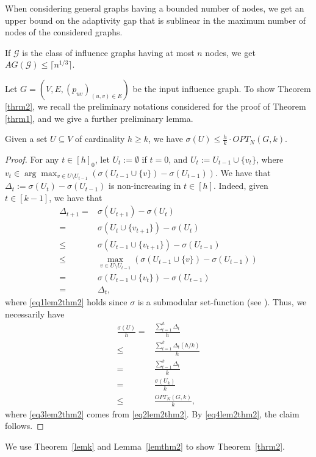 When considering general graphs having a bounded number of nodes, we get an upper bound on the adaptivity gap that is sublinear in the maximum number of nodes of the considered graphs. 

\begin{theorem}\label{thrm2}
If $\mathcal{G}$ is the class of influence graphs having at most $n$ nodes, we get $AG(\mathcal{G})\leq \lceil n^{1/3}\rceil .$ 
\end{theorem}

Let $G=(V,E,(p_{uv})_{(u,v)\in E})$ be the input influence graph. To show Theorem \ref{thrm2}, we recall the preliminary notations considered for the proof of Theorem \ref{thrm1}, and we give a further preliminary lemma. 
\begin{lemma}\label{lemthm2}
Given a set $U\subseteq V$ of cardinality $h\geq k$, we have $\sigma(U)\leq \frac{h}{k}\cdot OPT_N(G,k).$
\end{lemma}
\begin{proof}
For any $t\in [h]_0$, let $U_t:=\emptyset$ if $t=0$, and $U_t:=U_{t-1}\cup\{v_t\}$, where $v_t\in\arg\max_{v\in U\setminus U_{t-1}}(\sigma(U_{t-1}\cup\{v\})-\sigma(U_{t-1})).$ We have that $\Delta_t:=\sigma(U_{t})-\sigma(U_{t-1})$ is non-increasing in $t\in [h]$. Indeed, given $t\in [k-1]$, we have that
\begin{align}
\Delta_{t+1}=&\sigma(U_{t+1})-\sigma(U_{t})\nonumber\\
=&\sigma(U_{t}\cup\{v_{t+1}\})-\sigma(U_{t})\nonumber\\
\leq &\sigma(U_{t-1}\cup\{v_{t+1}\})-\sigma(U_{t-1})\label{eq1lem2thm2}\\
\leq &\max_{v\in U\setminus U_{t-1}}(\sigma(U_{t-1}\cup\{v\})-\sigma(U_{t-1}))\nonumber\\
=&\sigma(U_{t-1}\cup\{v_{t}\})-\sigma(U_{t-1})\nonumber\\
=&\Delta_t,\label{eq2lem2thm2}
\end{align}
where \eqref{eq1lem2thm2} holds since $\sigma$ is a submodular set-function (see \cite{Kempe2015}). Thus, we necessarily have 
\begin{align}
\frac{\sigma(U)}{h}=&\frac{\sum_{t=1}^h\Delta_t}{h}\nonumber\\
\leq &\frac{\sum_{t=1}^k\Delta_t\left(h/k\right)}{h}\label{eq3lem2thm2}\\
=&\frac{\sum_{t=1}^k\Delta_t}{k}\nonumber\\
=&\frac{\sigma(U_k)}{k}\nonumber\\
\leq &\frac{OPT_N(G,k)}{k},\label{eq4lem2thm2}
\end{align}
where \eqref{eq3lem2thm2} comes from \eqref{eq2lem2thm2}. By \eqref{eq4lem2thm2}, the claim follows.
\end{proof}
We use Theorem~\ref{lemk} and Lemma~\ref{lemthm2} to show Theorem~\ref{thrm2}.

